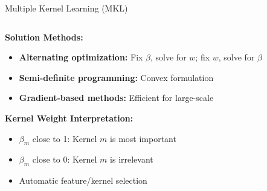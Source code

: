 \documentclass[8pt,aspectratio=1610]{beamer}
\begin{document}
\begin{frame}{Multiple Kernel Learning (MKL)}
\begin{columns}[t]
\begin{column}{0.48\textwidth}
\vspace{0.3cm}
\textbf{Solution Methods:}
\begin{itemize}
\setlength{\itemsep}{1pt}
\item \textbf{Alternating optimization:} Fix $\beta$, solve for $w$; fix $w$, solve for $\beta$
\item \textbf{Semi-definite programming:} Convex formulation
\item \textbf{Gradient-based methods:} Efficient for large-scale
\end{itemize}

\vspace{0.3cm}
\textbf{Kernel Weight Interpretation:}
\begin{itemize}
\setlength{\itemsep}{1pt}
\item $\beta_m$ close to 1: Kernel $m$ is most important
\item $\beta_m$ close to 0: Kernel $m$ is irrelevant
\item Automatic feature/kernel selection
\end{itemize}
\end{column}
\end{columns}
\end{frame}
\end{document}
